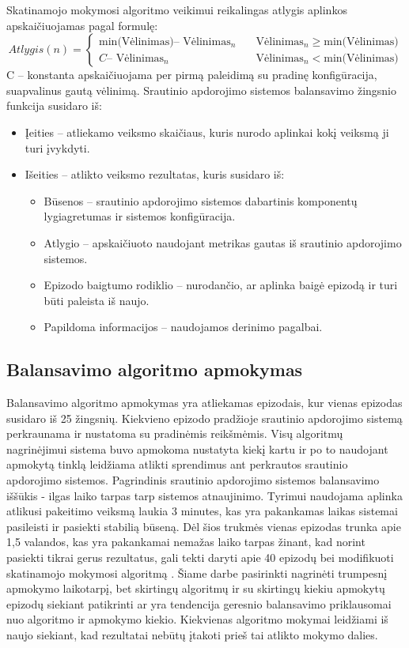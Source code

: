 \documentclass{VUMIFPSbakalaurinis}
\begin{document}
Skatinamojo mokymosi algoritmo veikimui reikalingas atlygis aplinkos apskaičiuojamas pagal formulę:
\[ Atlygis(n) =
\begin{cases}
    \text{min(Vėlinimas)} – \text{ Vėlinimas}_n  & \quad \text{Vėlinimas}_n \geq \text{min(Vėlinimas)}\\
    C – \text{ Vėlinimas}_n  & \quad \text{Vėlinimas}_n < \text{min(Vėlinimas)}
\end{cases}
\]
C – konstanta apskaičiuojama per pirmą paleidimą su pradinę konfigūracija, suapvalinus gautą vėlinimą. \newline
Srautinio apdorojimo sistemos balansavimo žingsnio funkcija susidaro iš:
\begin{itemize}
 \item Įeities – atliekamo veiksmo skaičiaus, kuris nurodo aplinkai kokį veiksmą ji turi įvykdyti.
 \item Išeities – atlikto veiksmo rezultatas, kuris susidaro iš:
 \begin{itemize}
    \item Būsenos – srautinio apdorojimo sistemos dabartinis komponentų lygiagretumas ir sistemos konfigūracija.
    \item Atlygio – apskaičiuoto naudojant metrikas gautas iš srautinio apdorojimo sistemos.
    \item Epizodo baigtumo rodiklio – nurodančio, ar aplinka baigė epizodą ir turi būti paleista iš naujo.
    \item Papildoma informacijos – naudojamos derinimo pagalbai.
 \end{itemize}
\end{itemize}

\subsection{Balansavimo algoritmo apmokymas}

Balansavimo algoritmo apmokymas yra atliekamas epizodais, kur vienas epizodas susidaro iš 25 žingsnių. Kiekvieno epizodo pradžioje srautinio apdorojimo sistemą perkraunama ir nustatoma su pradinėmis reikšmėmis. Visų algoritmų nagrinėjimui sistema buvo apmokoma nustatyta kiekį kartu ir po to naudojant apmokytą tinklą leidžiama atlikti sprendimus ant perkrautos srautinio apdorojimo sistemos. Pagrindinis srautinio apdorojimo sistemos balansavimo iššūkis - ilgas laiko tarpas tarp sistemos atnaujinimo. Tyrimui naudojama aplinka atlikusi pakeitimo veiksmą laukia 3 minutes, kas yra pakankamas laikas sistemai pasileisti ir pasiekti stabilią būseną. Dėl šios trukmės vienas epizodas trunka apie 1,5 valandos, kas yra pakankamai nemažas laiko tarpas žinant, kad norint pasiekti tikrai gerus rezultatus, gali tekti daryti apie 40 epizodų bei modifikuoti skatinamojo mokymosi algoritmą \cite{vaquero2018autotuning}. Šiame darbe pasirinkti nagrinėti trumpesnį apmokymo laikotarpį, bet skirtingų algoritmų ir su skirtingų kiekiu apmokytų epizodų siekiant patikrinti ar yra tendencija geresnio balansavimo priklausomai nuo algoritmo ir apmokymo kiekio. Kiekvienas algoritmo mokymai leidžiami iš naujo siekiant, kad rezultatai nebūtų įtakoti prieš tai atlikto mokymo dalies.
\end{document}
